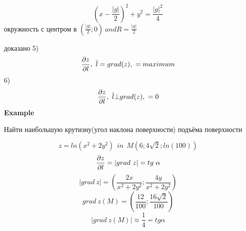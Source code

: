 \documentclass{article}
\begin{document}
\begin{equation*}
    \left(x - \frac{|g|}{2}\right)^2+y^2 = \frac{|g|^2}{4}
\end{equation*}
окружность с центром в $(\frac{|g|}{2};0)\ and R = \frac{|g|}{2}$ 

доказано
5) 
\begin{equation*}
    \pdv{z}{l}, \ \overline{l} = grad(z),\ = maximum
\end{equation*}
6)
\begin{equation*}
    \pdv{z}{l}, \ \overline{l} \bot  grad(z),\  = 0
\end{equation*}
\textbf{Example}

Найти наибольшую крутизну(угол наклона поверхности) подъёма поверхности

\begin{equation*}
    z = ln(x^2+2y^2) \ \ in\ \  M(6;4\sqrt{2};ln(100))
\end{equation*}
\begin{equation*}
    \pdv{z}{l} = |grad\ z| = tg\ \alpha
\end{equation*}
\begin{equation*}
    |grad\ z| = (\frac{2x}{x^2+2y^2}; \frac{4y}{x^2+2y^2})
\end{equation*}
\begin{equation*}
    grad\ z(M) = (\frac{12}{100};\frac{16\sqrt{2}}{100})
\end{equation*}
\begin{equation*}
    |grad\ z(M)| \approx  \frac{1}{4} = tg\alpha
\end{equation*}
\end{document}
